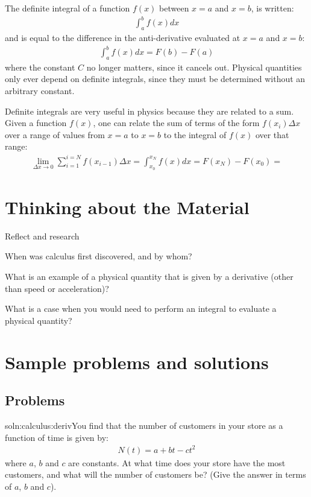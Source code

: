 \begin{chapterSummary}
The definite integral of a function $f(x)$ between $x=a$ and $x=b$, is written:
\begin{align*}
\int_a^b f(x) dx
\end{align*}
and is equal to the difference in the anti-derivative evaluated at $x=a$ and $x=b$:
\begin{align*}
\int_a^b f(x) dx = F(b) - F(a)
\end{align*}
where the constant $C$ no longer matters, since it cancels out. Physical quantities only ever depend on definite integrals, since they must be determined without an arbitrary constant. 

Definite integrals are very useful in physics because they are related to a sum. Given a function $f(x)$, one can relate the sum of terms of the form $f(x_i)\Delta x$ over a range of values from $x=a$ to $x=b$ to the integral of $f(x)$ over that range:
\begin{align*}
\lim_{\Delta x\to 0}\sum_{i=1}^{i=N} f(x_{i-1}) \Delta x = \int_{x_0}^{x_N}f(x) dx=F(x_N) - F(x_0)=
\end{align*}
\end{chapterSummary}

\section{Thinking about the Material}
\begin{chapteractivity}{Reflect and research}
{
\item When was calculus first discovered, and by whom?
\item What is an example of a physical quantity that is given by a derivative (other than speed or acceleration)?
\item What is a case when you would need to perform an integral to evaluate a physical quantity?
}
\end{chapteractivity}

\section{Sample problems and solutions}
\subsection{Problems} 
\begin{problem}{soln:calculus:deriv}{\label{prob:calculus:deriv}You find that the number of customers in your store as a function of time is given by:
\begin{align*}
N(t) = a+bt-ct^2
\end{align*}
where $a$, $b$ and $c$ are constants. At what time does your store have the most customers, and what will the number of customers be? (Give the answer in terms of $a$, $b$ and $c$).}
\end{problem}

